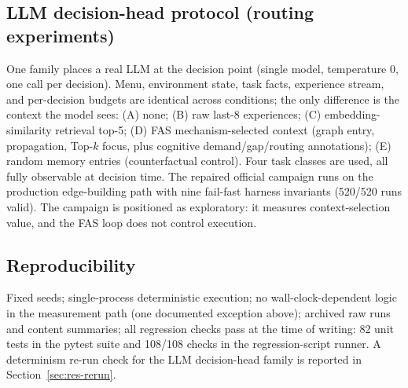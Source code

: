 \documentclass[10pt,a4paper]{article}
\begin{document}
\subsection{LLM decision-head protocol (routing experiments)}
\label{sec:method-routing}
One family places a real LLM at the decision point (single model, temperature 0, one call per decision). Menu, environment state, task facts, experience stream, and per-decision budgets are identical across conditions; the only difference is the context the model sees: (A) none; (B) raw last-8 experiences; (C) embedding-similarity retrieval top-5; (D) FAS mechanism-selected context (graph entry, propagation, Top-$k$ focus, plus cognitive demand/gap/routing annotations); (E) random memory entries (counterfactual control). Four task classes are used, all fully observable at decision time. The repaired official campaign runs on the production edge-building path with nine fail-fast harness invariants (520/520 runs valid). The campaign is positioned as exploratory: it measures context-selection value, and the FAS loop does not control execution.

\subsection{Reproducibility}
Fixed seeds; single-process deterministic execution; no wall-clock-dependent logic in the measurement path (one documented exception above); archived raw runs and content summaries; all regression checks pass at the time of writing: 82 unit tests in the pytest suite and 108/108 checks in the regression-script runner. A determinism re-run check for the LLM decision-head family is reported in Section~\ref{sec:res-rerun}.
\end{document}
